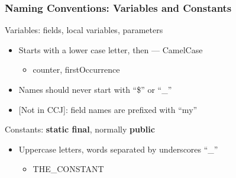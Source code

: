 \documentclass[screen]{beamer}
\begin{document}
\begin{frame}[fragile]
\frametitle{Naming Conventions: Variables and Constants}%
%
\begin{block}{Variables: fields, local variables, parameters}
	\begin{itemize}
		\item Starts with a lower case letter, then --- CamelCase
			\begin{itemize}
				\item counter, firstOccurrence
			\end{itemize}
		\item Names should never start with ``\$'' or ``\_''
		\item{} [Not in CCJ]: field names are prefixed with ``my''
	\end{itemize}
\end{block}
\begin{block}{Constants: {\bf static final}, normally {\bf public}}
	\begin{itemize}
		\item Uppercase letters, words separated by underscores ``\_''
			\begin{itemize}
				\item THE\_CONSTANT
			\end{itemize}
	\end{itemize}
\end{block}
\end{frame}
\end{document}
